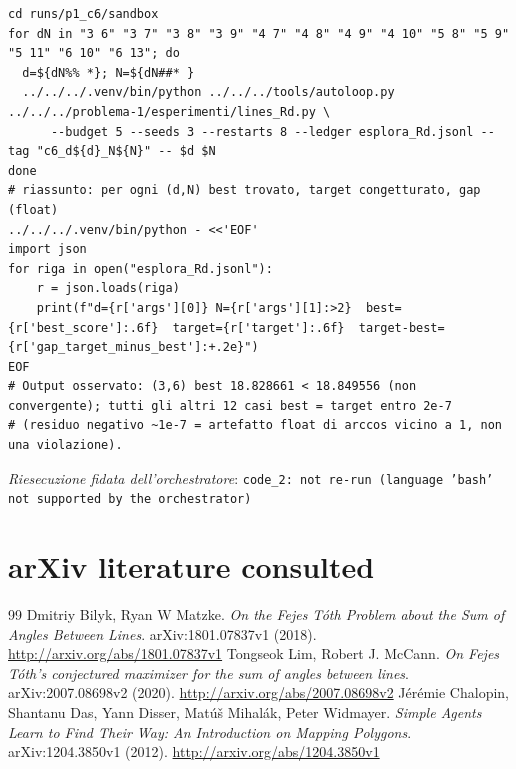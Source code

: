 \documentclass[11pt,a4paper]{article}
\begin{document}
\begin{lstlisting}[caption={attempt\_001 code\_2 [bash, rigore float\_exploration\_only] — Float-only hill-climbing search for configurations exceeding the conjectured bound in R\textasciicircum{}3. — verdetto del Referee: REJECT}]
cd runs/p1_c6/sandbox
for dN in "3 6" "3 7" "3 8" "3 9" "4 7" "4 8" "4 9" "4 10" "5 8" "5 9" "5 11" "6 10" "6 13"; do
  d=${dN%% *}; N=${dN##* }
  ../../../.venv/bin/python ../../../tools/autoloop.py ../../../problema-1/esperimenti/lines_Rd.py \
      --budget 5 --seeds 3 --restarts 8 --ledger esplora_Rd.jsonl --tag "c6_d${d}_N${N}" -- $d $N
done
# riassunto: per ogni (d,N) best trovato, target congetturato, gap (float)
../../../.venv/bin/python - <<'EOF'
import json
for riga in open("esplora_Rd.jsonl"):
    r = json.loads(riga)
    print(f"d={r['args'][0]} N={r['args'][1]:>2}  best={r['best_score']:.6f}  target={r['target']:.6f}  target-best={r['gap_target_minus_best']:+.2e}")
EOF
# Output osservato: (3,6) best 18.828661 < 18.849556 (non convergente); tutti gli altri 12 casi best = target entro 2e-7
# (residuo negativo ~1e-7 = artefatto float di arccos vicino a 1, non una violazione).
\end{lstlisting}
\noindent\emph{Riesecuzione fidata dell'orchestratore}: \texttt{code\_2: not re-run (language 'bash' not supported by the orchestrator)}

\section{arXiv literature consulted}
\begin{thebibliography}{99}
 Dmitriy Bilyk, Ryan W Matzke. \emph{On the Fejes Tóth Problem about the Sum of Angles Between Lines}. arXiv:1801.07837v1 (2018). \url{http://arxiv.org/abs/1801.07837v1}
\bibitem{2007.08698v2} Tongseok Lim, Robert J. McCann. \emph{On Fejes Tóth's conjectured maximizer for the sum of angles between lines}. arXiv:2007.08698v2 (2020). \url{http://arxiv.org/abs/2007.08698v2}
\bibitem{1204.3850v1} Jérémie Chalopin, Shantanu Das, Yann Disser, Matúš Mihalák, Peter Widmayer. \emph{Simple Agents Learn to Find Their Way: An Introduction on Mapping Polygons}. arXiv:1204.3850v1 (2012). \url{http://arxiv.org/abs/1204.3850v1}
\end{thebibliography}
\end{document}
